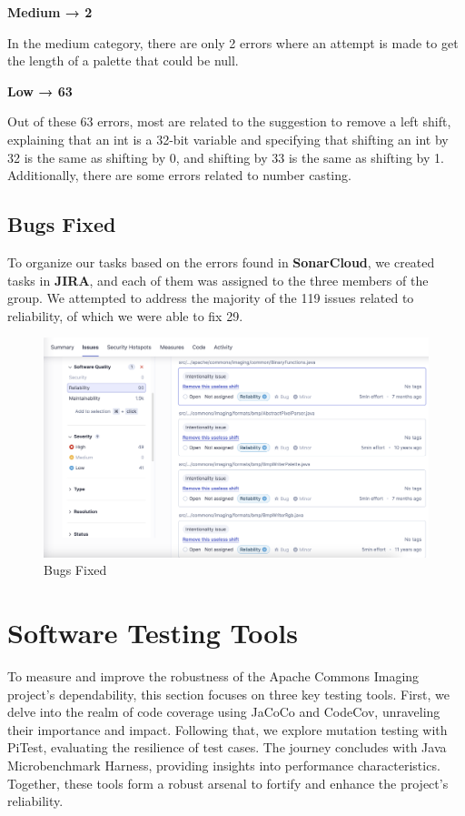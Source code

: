 \documentclass[sigconf]{acmart}
\begin{document}
\textbf{Medium → 2}

In the medium category, there are only 2 errors where an attempt is made to get the length of a palette that could be null.

\textbf{Low → 63}

Out of these 63 errors, most are related to the suggestion to remove a left shift, explaining that an int is a 32-bit variable and specifying that shifting an int by 32 is the same as shifting by 0, and shifting by 33 is the same as shifting by 1. Additionally, there are some errors related to number casting.

\subsection{Bugs Fixed}

To organize our tasks based on the errors found in \textbf{SonarCloud}\cite{sonarcloud}, we created tasks in \textbf{JIRA}\cite{jira}, and each of them was assigned to the three members of the group. We attempted to address the majority of the 119 issues related to reliability, of which we were able to fix 29.

\begin{figure}[h!]
    \centering
    \includegraphics[width=1\linewidth]{reportSonarCloudFixed.png}
    \caption{Bugs Fixed}
    \label{fig:enter-label}
\end{figure}


\section{Software Testing Tools}

To measure and improve the robustness of the Apache Commons Imaging project's dependability, this section focuses on three key testing tools. First, we delve into the realm of code coverage using JaCoCo and CodeCov, unraveling their importance and impact. Following that, we explore mutation testing with PiTest, evaluating the resilience of test cases. The journey concludes with Java Microbenchmark Harness, providing insights into performance characteristics. Together, these tools form a robust arsenal to fortify and enhance the project's reliability.
\end{document}
